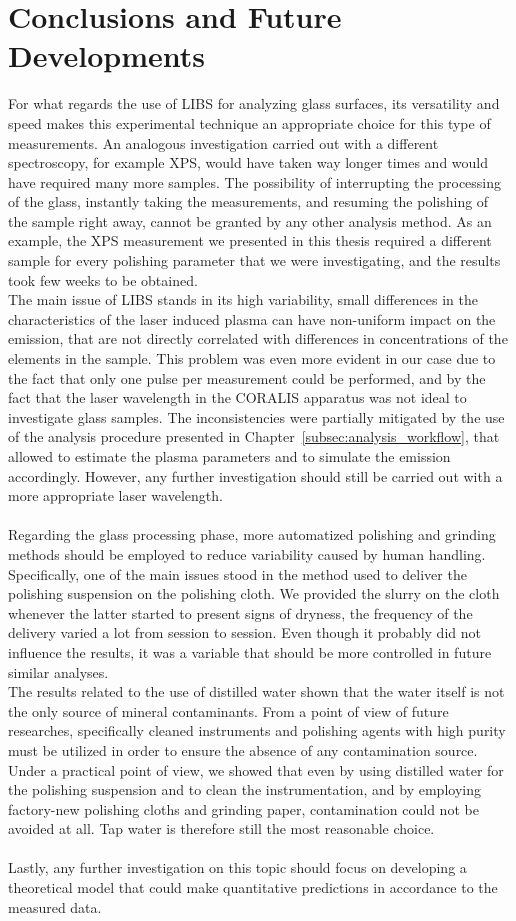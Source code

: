 \chapter*{Conclusions and Future Developments}
\label{ch:conclusions_and_dev}
For what regards the use of LIBS for analyzing glass surfaces, its versatility and speed makes this experimental technique an appropriate choice for this type of measurements. An analogous investigation carried out with a different spectroscopy, for example XPS, would have taken way longer times and would have required many more samples. The possibility of interrupting the processing of the glass, instantly taking the measurements, and resuming the polishing of the sample right away, cannot be granted by any other analysis method. As an example, the XPS measurement we presented in this thesis required a different sample for every polishing parameter that we were investigating, and the results took few weeks to be obtained.
\\
The main issue of LIBS stands in its high variability, small differences in the characteristics of the laser induced plasma can have non-uniform impact on the emission, that are not directly correlated with differences in concentrations of the elements in the sample. This problem was even more evident in our case due to the fact that only one pulse per measurement could be performed, and by the fact that the laser wavelength in the CORALIS apparatus was not ideal to investigate glass samples. The inconsistencies were partially mitigated by the use of the analysis procedure presented in Chapter~\ref{subsec:analysis_workflow}, that allowed to estimate the plasma parameters and to simulate the emission accordingly. However, any further investigation should still be carried out with a more appropriate laser wavelength.
\\
\\
Regarding the glass processing phase, more automatized polishing and grinding methods should be employed to reduce variability caused by human handling. Specifically, one of the main issues stood in the method used to deliver the polishing suspension on the polishing cloth. We provided the slurry on the cloth whenever the latter started to present signs of dryness, the frequency of the delivery varied a lot from session to session. Even though it probably did not influence the results, it was a variable that should be more controlled in future similar analyses.
\\
The results related to the use of distilled water shown that the water itself is not the only source of mineral contaminants. From a point of view of future researches, specifically cleaned instruments and polishing agents with high purity must be utilized in order to ensure the absence of any contamination source. Under a practical point of view, we showed that even by using distilled water for the polishing suspension and to clean the instrumentation, and by employing factory-new polishing cloths and grinding paper, contamination could not be avoided at all. Tap water is therefore still the most reasonable choice.
\\
\\
Lastly, any further investigation on this topic should focus on developing a theoretical model that could make quantitative predictions in accordance to the measured data.
